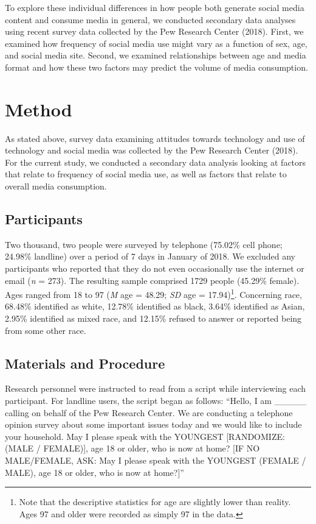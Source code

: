 \documentclass[man, fleqn, noextraspace]{apa6}
\let\rmarkdownfootnote\footnote%
\def\footnote{\protect\rmarkdownfootnote}
\theoremstyle{definition}
\theoremstyle{definition}
\theoremstyle{definition}
\theoremstyle{remark}
\begin{document}
To explore these individual differences in how people both generate
social media content and consume media in general, we conducted
secondary data analyses using recent survey data collected by the Pew
Research Center (2018). First, we examined how frequency of social media
use might vary as a function of sex, age, and social media site. Second,
we examined relationships between age and media format and how these two
factors may predict the volume of media consumption.

\section{Method}\label{method}

As stated above, survey data examining attitudes towards technology and
use of technology and social media was collected by the Pew Research
Center (2018). For the current study, we conducted a secondary data
analysis looking at factors that relate to frequency of social media
use, as well as factors that relate to overall media consumption.

\subsection{Participants}\label{participants}

Two thousand, two people were surveyed by telephone (75.02\% cell phone;
24.98\% landline) over a period of 7 days in January of 2018. We
excluded any participants who reported that they do not even
occasionally use the internet or email (\emph{n} = 273). The resulting
sample comprised 1729 people (45.29\% female). Ages ranged from 18 to 97
(\emph{M} age = 48.29; \emph{SD} age =
17.94)\footnote{Note that the descriptive statistics for age are slightly lower than reality. Ages 97 and older were recorded as simply 97 in the data.}.
Concerning race, 68.48\% identified as white, 12.78\% identified as
black, 3.64\% identified as Asian, 2.95\% identified as mixed race, and
12.15\% refused to answer or reported being from some other race.

\subsection{Materials and Procedure}\label{materials-and-procedure}

Research personnel were instructed to read from a script while
interviewing each participant. For landline users, the script began as
follows: \enquote{Hello, I am \_\_\_\_\_ calling on behalf of the Pew
Research Center. We are conducting a telephone opinion survey about some
important issues today and we would like to include your household. May
I please speak with the YOUNGEST {[}RANDOMIZE: (MALE / FEMALE){]}, age
18 or older, who is now at home? {[}IF NO MALE/FEMALE, ASK: May I please
speak with the YOUNGEST (FEMALE / MALE), age 18 or older, who is now at
home?{]}}
\end{document}
